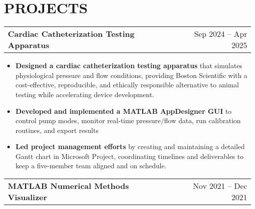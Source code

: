 \documentclass[a4paper,10pt]{article}
\begin{document}
\section{PROJECTS}
\begin{tabularx}{\linewidth}{@{}X r@{}}
\begin{minipage}[t]{\linewidth}
  \textbf{Cardiac Catheterization Testing Apparatus}
\end{minipage}
&     Sep 2024 -- Apr 2025
\end{tabularx}
\begin{itemize}[nosep,after=\strut, leftmargin=1em, itemsep=3pt,label=--]
  \item \textbf{Designed a cardiac catheterization testing apparatus} that simulates physiological pressure and flow conditions, providing Boston Scientific with a cost-effective, reproducible, and ethically responsible alternative to animal testing while accelerating device development.
\item \textbf{Developed and implemented a MATLAB AppDesigner GUI} to control pump modes, monitor real-time pressure/flow data, run calibration routines, and export results
\item \textbf{Led project management efforts} by creating and maintaining a detailed Gantt chart in Microsoft Project, coordinating timelines and deliverables to keep a five-member team aligned and on schedule.
\end{itemize}
\begin{tabularx}{\linewidth}{@{}X r@{}}
\begin{minipage}[t]{\linewidth}
  \textbf{MATLAB Numerical Methods Visualizer}
\end{minipage}
&     Nov 2021 -- Dec 2021
\end{tabularx}
\end{document}
